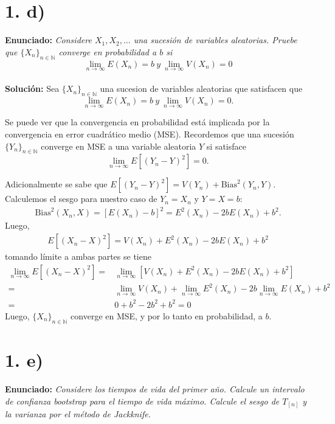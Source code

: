 \documentclass[fleqn]{article}
\begin{document}
\section*{1. d)}
\textbf{Enunciado:} \textit{Considere $X_1,X_2,\hdots$ una sucesión de variables aleatorias. Pruebe que $\{X_n\}_{n\in\mathbb{N}}$ converge en probabilidad a $b$ si 
\[
\lim_{n\rightarrow\infty}E(X_n)=b \ y \ \lim_{n\rightarrow\infty}V(X_n)=0
\]}\\
\textbf{Solución:} Sea $\{X_n\}_{n\in\mathbb{N}}$ una sucesion de variables aleatorias que satisfacen que 
\begin{equation}\label{eq:cond}
\lim_{n\rightarrow\infty}E(X_n)=b \ y \ \lim_{n\rightarrow\infty}V(X_n)=0.
\end{equation}

Se puede ver que la convergencia en probabilidad está implicada por la convergencia en error cuadrático medio (MSE). Recordemos que una sucesión $\{Y_n\}_{n\in\mathbb{N}}$ converge en MSE a una variable aleatoria $Y$ si satisface
\[
  \lim_{n\rightarrow\infty}E\left[(Y_n-Y)^2\right]=0.
\]

Adicionalmente se sabe que $E\left[(Y_n-Y)^2\right]=V(Y_n)+\mathrm{Bias}^2(Y_n,Y)$. Calculemos el sesgo para nuestro caso de $Y_n=X_n$ y $Y=X=b$:
\begin{align*}
    \mathrm{Bias}^2(X_n,X) = \left[E(X_n) - b\right]^2=E^2(X_n) - 2bE(X_n) + b^2.
\end{align*}
Luego,
\begin{align*}
    E\left[(X_n-X)^2\right]=V(X_n)+E^2(X_n) - 2bE(X_n) + b^2
\end{align*}
tomando límite a ambas partes se tiene
\begin{align*}
    \lim_{n\rightarrow\infty}E\left[(X_n-X)^2\right]=&\lim_{n\rightarrow\infty}\left[V(X_n)+E^2(X_n) - 2bE(X_n) + b^2\right]\\
    =&\lim_{n\rightarrow\infty}V(X_n)+\lim_{n\rightarrow\infty}E^2(X_n) - 2b\lim_{n\rightarrow\infty}E(X_n) + b^2\\
    =&0+b^2-2b^2+b^2=0
\end{align*}
Luego, $\{X_n\}_{n\in\mathbb{N}}$ converge en MSE, y por lo tanto en probabilidad, a $b$.
 
\section*{1. e)}
\textbf{Enunciado:} \textit{Considere los tiempos de vida del primer año. Calcule un intervalo de confianza bootstrap para el tiempo de vida máximo. Calcule el sesgo de $T_{[n]}$ y la varianza por el método de Jackknife.}
\end{document}
